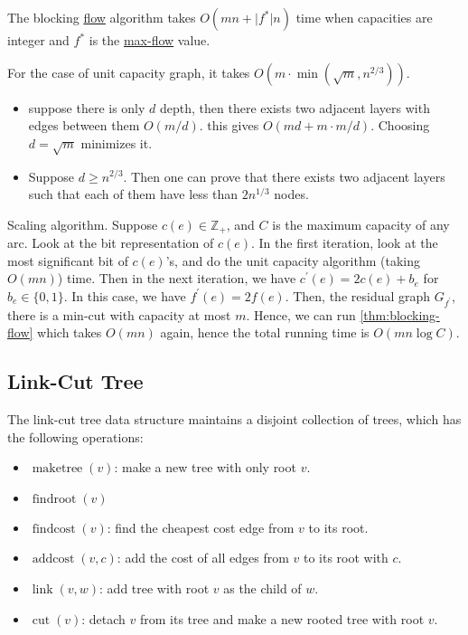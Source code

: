 \begin{theorem}\label{thm:blocking-flow}
	The blocking \hyperref[def:flow]{flow} algorithm takes \(O(mn + \lvert f^{\ast} \rvert n)\) time when capacities are integer and \(f^{\ast} \) is the \hyperref[prb:s-t-max-flow]{max-flow} value.
\end{theorem}

For the case of unit capacity graph, it takes \(O(m \cdot \min (\sqrt{m} , n^{2 / 3}))\).
\begin{itemize}
	\item suppose there is only \(d\) depth, then there exists two adjacent layers with edges between them \(O(m / d)\). this gives \(O(md + m \cdot m / d)\). Choosing \(d = \sqrt{m} \) minimizes it.
	\item Suppose \(d \geq n^{2 / 3}\). Then one can prove that there exists two adjacent layers such that each of them have less than \(2 n^{1 / 3}\) nodes.
\end{itemize}

Scaling algorithm. Suppose \(c(e) \in \mathbb{Z} _{+}\), and \(C\) is the maximum capacity of any arc. Look at the bit representation of \(c(e)\). In the first iteration, look at the most significant bit of \(c(e)\)'s, and do the unit capacity algorithm (taking \(O(mn)\)) time. Then in the next iteration, we have \(c^{\prime} (e) = 2 c(e) + b_e\) for \(b_e \in \{ 0, 1 \} \). In this case, we have \(f^{\prime} (e) = 2 f(e)\). Then, the residual graph \(G_{f^{\prime} }\), there is a min-cut with capacity at most \(m\). Hence, we can run \autoref{thm:blocking-flow} which takes \(O(mn)\) again, hence the total running time is \(O(mn \log C)\).

\subsection{Link-Cut Tree}
\begin{definition}\label{def:link-cut-tree}

\end{definition}
The link-cut tree data structure maintains a disjoint collection of trees, which has the following operations:
\begin{itemize}
	\item \(\operatorname{maketree}(v) \): make a new tree with only root \(v\).
	\item \(\operatorname{findroot}(v) \)
	\item \(\operatorname{findcost}(v) \): find the cheapest cost edge from \(v\) to its root.
	\item \(\operatorname{addcost}(v, c) \): add the cost of all edges from \(v\) to its root with \(c\).
	\item \(\operatorname{link}(v, w) \): add tree with root \(v\) as the child of \(w\).
	\item \(\operatorname{cut}(v) \): detach \(v\) from its tree and make a new rooted tree with root \(v\).
\end{itemize}

